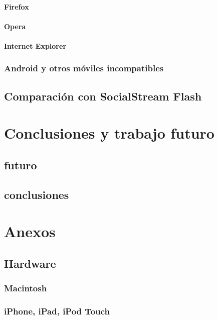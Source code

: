 		\subsubsection{Firefox}
		\subsubsection{Opera}
		\subsubsection{Internet Explorer}
	\subsection{Android y otros móviles incompatibles}
\section{Comparación con SocialStream Flash}

\chapter{Conclusiones y trabajo futuro}
	\section{futuro}
	\section{conclusiones}
	
	
\chapter{Anexos}
	\section{Hardware}
		\subsection{Macintosh}
		\subsection{iPhone, iPad, iPod Touch}
